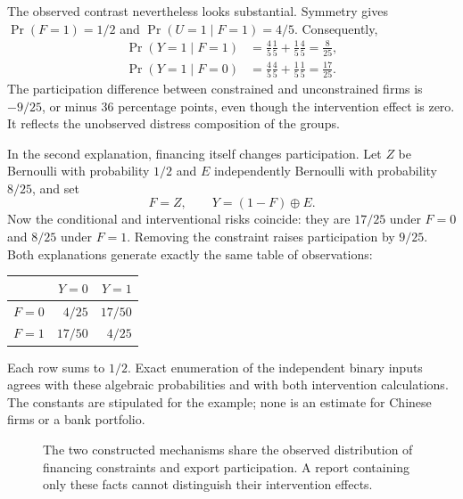 The observed contrast nevertheless looks substantial. Symmetry gives
$\Pr(F=1)=1/2$ and $\Pr(U=1\mid F=1)=4/5$. Consequently,
\begin{align}
 \Pr(Y=1\mid F=1)
 &=\frac45\frac15+\frac15\frac45=\frac8{25},\\
 \Pr(Y=1\mid F=0)
 &=\frac45\frac45+\frac15\frac15=\frac{17}{25}.
\end{align}
The participation difference between constrained and unconstrained firms is
$-9/25$, or minus 36 percentage points, even though the intervention effect
is zero. It reflects the unobserved distress composition of the groups.

In the second explanation, financing itself changes participation. Let
$Z$ be Bernoulli with probability $1/2$ and $E$ independently Bernoulli with
probability $8/25$, and set
\begin{equation}
 F=Z,\qquad Y=(1-F)\mathbin{\oplus}E.
 \label{closure30:causal}
\end{equation}
Now the conditional and interventional risks coincide: they are $17/25$
under $F=0$ and $8/25$ under $F=1$. Removing the constraint raises participation
by $9/25$. Both explanations generate exactly the same table of observations:
\begin{center}
\begin{tabular}{crr}
\toprule
 & $Y=0$ & $Y=1$\\
\midrule
$F=0$ & $4/25$ & $17/50$\\
$F=1$ & $17/50$ & $4/25$\\
\bottomrule
\end{tabular}
\end{center}
Each row sums to $1/2$. Exact enumeration of the independent binary inputs
agrees with these algebraic probabilities and with both intervention
calculations. The constants are stipulated for the example; none is an
estimate for Chinese firms or a bank portfolio.

\begin{figure}[htbp]
\centering
{}
\caption{The two constructed mechanisms share the observed distribution
of financing constraints and export participation. A report containing only
these facts cannot distinguish their intervention effects.}
\label{closure30:twoworlds}
\end{figure}

